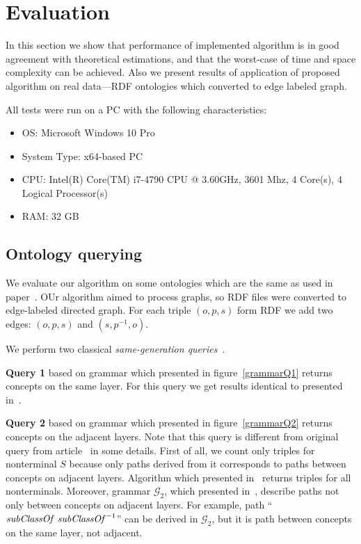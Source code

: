 \section{Evaluation}

In this section we show that performance of implemented algorithm is in good agreement with theoretical estimations, and that the worst-case of time and space complexity can be achieved. Also we present results of application of proposed algorithm on real data---RDF ontologies which converted to edge labeled graph.

All tests were run on a PC with the following characteristics:
\begin{itemize}
\item OS: Microsoft Windows 10 Pro
\item System Type: x64-based PC
\item CPU: Intel(R) Core(TM) i7-4790 CPU @ 3.60GHz, 3601 Mhz, 4 Core(s), 4 Logical Processor(s)
\item RAM: 32 GB
\end{itemize}


\subsection{Ontology querying}

We evaluate our algorithm on some ontologies which are the same as used in paper~\cite{CFGonRDF}.
OUr algorithm aimed to process graphs, so RDF files were converted to edge-labeled directed graph.
For each triple $(o,p,s)$ form RDF we add two edges: $(o,p,s)$ and $(s,p^{-1},o)$.

We perform two classical \textit{same-generation queries}~\cite{FndDB}.

\textbf{Query 1} based on grammar which presented in figure~\ref{grammarQ1} returns concepts on the same layer.
For this query we get results identical to presented in~\cite{CFGonRDF}. 

\textbf{Query 2} based on grammar which presented in figure~\ref{grammarQ2} returns concepts on the adjacent layers. 
Note that this query is different from original query from article~\cite{CFGonRDF} in some details.
First of all, we count only triples for nonterminal $S$ because only paths derived from it corresponds to paths between concepts on adjacent layers.
Algorithm which presented in~\cite{CFGonRDF} returns triples for all nonterminals.
Moreover, grammar $\mathcal{G}_2$, which presented in~\cite{CFGonRDF}, describe paths not only between concepts on adjacent layers.
For example, path ``$\text{\textit{subClassOf} \textit{subClassOf}}^{-1}$'' can be derived in $\mathcal{G}_2$, but it is path between concepts on the same layer, not adjacent.

